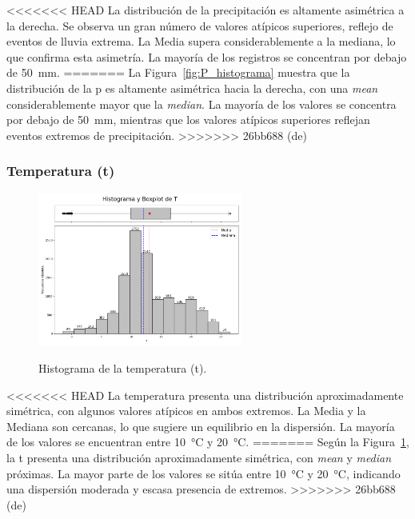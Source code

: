<<<<<<< HEAD
La distribución de la precipitación es altamente asimétrica a la derecha. Se observa un gran número de valores atípicos superiores, reflejo de eventos de lluvia extrema. La Media supera considerablemente a la mediana, lo que confirma esta asimetría. La mayoría de los registros se concentran por debajo de \SI{50}{\milli\meter}.
=======
La Figura~\ref{fig:P_histograma} muestra que la distribución de la \gls{p} es altamente asimétrica hacia la derecha, con una \textit{mean} considerablemente mayor que la \textit{median}. La mayoría de los valores se concentra por debajo de \SI{50}{\milli\meter}, mientras que los valores atípicos superiores reflejan eventos extremos de precipitación.
>>>>>>> 26bb688 (de)

\vspace{1.5em}

\subsubsection*{Temperatura (\gls{t})}

\begin{figure}[htbp]
    \centering
    \caption{Histograma de la temperatura (\gls{t}).}
    \includegraphics[width=0.6\textwidth]{resultados/global/univariado/T_histograma.png}
    \label{fig:T_histograma}
\end{figure}

<<<<<<< HEAD
La temperatura presenta una distribución aproximadamente simétrica, con algunos valores atípicos en ambos extremos. La Media y la Mediana son cercanas, lo que sugiere un equilibrio en la dispersión. La mayoría de los valores se encuentran entre \SI{10}{\degreeCelsius} y \SI{20}{\degreeCelsius}.
=======
Según la Figura~\ref{fig:T_histograma}, la \gls{t} presenta una distribución aproximadamente simétrica, con \textit{mean} y \textit{median} próximas. La mayor parte de los valores se sitúa entre \SI{10}{\degreeCelsius} y \SI{20}{\degreeCelsius}, indicando una dispersión moderada y escasa presencia de extremos.
>>>>>>> 26bb688 (de)

